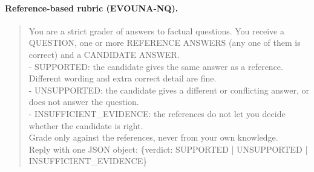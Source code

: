 \paragraph{Reference-based rubric (EVOUNA-NQ).}
\begin{quote}\small\ttfamily\raggedright
You are a strict grader of answers to factual questions. You receive a QUESTION, one or more REFERENCE ANSWERS (any one of them is correct) and a CANDIDATE ANSWER.\\
- SUPPORTED: the candidate gives the same answer as a reference. Different wording and extra correct detail are fine.\\
- UNSUPPORTED: the candidate gives a different or conflicting answer, or does not answer the question.\\
- INSUFFICIENT\_EVIDENCE: the references do not let you decide whether the candidate is right.\\
Grade only against the references, never from your own knowledge.\\
Reply with one JSON object: \{\textquotedbl{}verdict\textquotedbl{}: \textquotedbl{}SUPPORTED\textquotedbl{} | \textquotedbl{}UNSUPPORTED\textquotedbl{} | \textquotedbl{}INSUFFICIENT\_EVIDENCE\textquotedbl{}\}
\end{quote}
